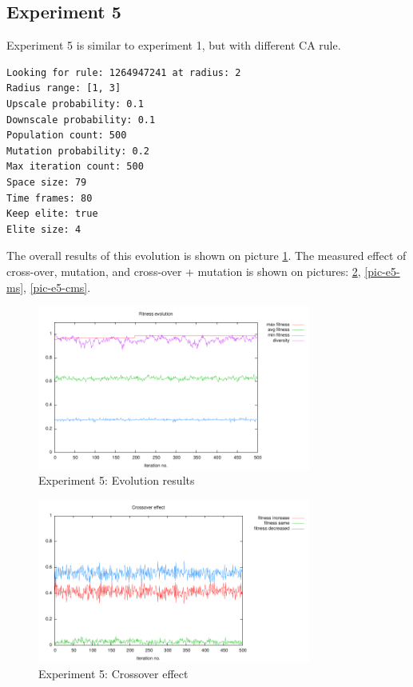 \documentclass[12pt,a4paper]{article}
\begin{document}
\subsection{Experiment 5}
Experiment 5 is similar to experiment 1, but with different CA rule.

\begin{verbatim}
Looking for rule: 1264947241 at radius: 2
Radius range: [1, 3]
Upscale probability: 0.1
Downscale probability: 0.1
Population count: 500
Mutation probability: 0.2
Max iteration count: 500
Space size: 79
Time frames: 80
Keep elite: true
Elite size: 4
\end{verbatim}

The overall results of this evolution is shown on picture \ref{pic-e5-results}. The measured effect of cross-over, mutation, and cross-over + mutation is shown on pictures: \ref{pic-e5-cs}, \ref{pic-e5-ms}, \ref{pic-e5-cms}.

\begin{figure}
\centering
\includegraphics[width=0.8\textwidth]{results/5/1.pdf}
\caption{Experiment 5: Evolution results}
\label{pic-e5-results}
\end{figure}

\begin{figure}
\centering
\includegraphics[width=0.8\textwidth]{results/5/1-cs.pdf}
\caption{Experiment 5: Crossover effect}
\label{pic-e5-cs}
\end{figure}
\end{document}
